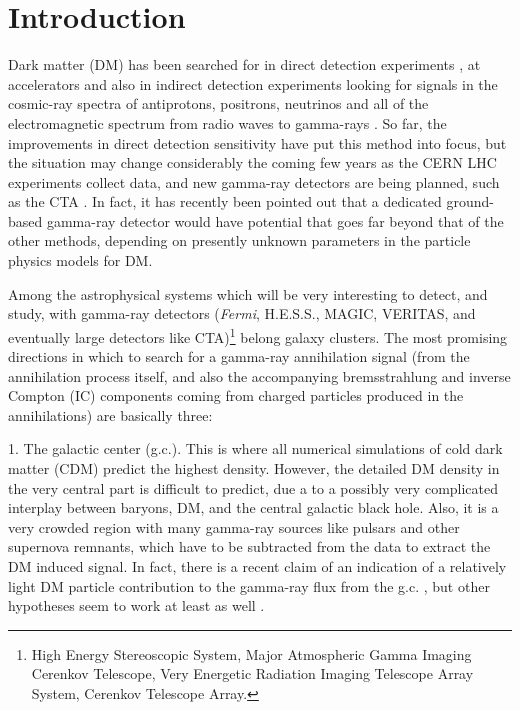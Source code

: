 \documentclass[10pt,aps,pra,reprint,amsmath,amsfonts,amssymb,showpacs,nofootinbib,floatfix]{revtex4-1}
\newcommand{\Fermi}{{\em Fermi}\xspace}
\begin{document}
\maketitle
\section{Introduction}

Dark matter (DM) has been searched for in direct detection experiments
\cite{Pato:2010zk}, at accelerators
\cite{Ellis:2001hv,Baer:2006ff,Khachatryan:2011tk} and also in
indirect detection experiments looking for signals in the cosmic-ray
spectra of antiprotons, positrons, neutrinos and all of the
electromagnetic spectrum from radio waves to gamma-rays
\cite{Bergstrom:2009ib}. So far, the improvements in direct detection
sensitivity have put this method into focus, but the situation may
change considerably the coming few years as the CERN LHC experiments
collect data, and new gamma-ray detectors are being planned, such as
the CTA \cite{Consortium:2010bc}. In fact, it has recently been
pointed out \cite{Bergstrom:2010gh} that a dedicated ground-based
gamma-ray detector would have potential that goes far beyond that of
the other methods, depending on presently unknown parameters in the
particle physics models for DM.

Among the astrophysical systems which will be very interesting to detect, and
study, with gamma-ray detectors (\Fermi, H.E.S.S., MAGIC, VERITAS, and
eventually large detectors like CTA)\footnote{{High Energy Stereoscopic System,
    Major Atmospheric Gamma Imaging Cerenkov Telescope, Very Energetic Radiation
    Imaging Telescope Array System, Cerenkov Telescope Array.}} belong galaxy
clusters. The most promising directions in which to search for a gamma-ray
annihilation signal (from the annihilation process itself, and also the
accompanying bremsstrahlung and inverse Compton (IC) components coming from
charged particles produced in the annihilations) are basically three:

1. The galactic center (g.c.). This is where all numerical simulations
of cold dark matter (CDM) predict the highest density. However, the
detailed DM density in the very central part is difficult to predict,
due a to a possibly very complicated interplay between baryons, DM,
and the central galactic black hole. Also, it is a very crowded region
with many gamma-ray sources like pulsars and other supernova remnants,
which have to be subtracted from the data to extract the DM induced
signal. In fact, there is a recent claim of an indication of a
relatively light DM particle contribution to the gamma-ray flux from
the g.c. \cite{2010arXiv1010.2752H}, 
but other hypotheses seem to work
at least as well \cite{2010arXiv1012.5839B}.
\end{document}
